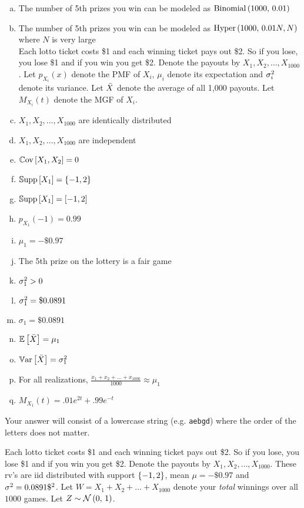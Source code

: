 \documentclass[12pt,landscape]{article}
\newcommand{\instr}{\small Your answer will consist of a lowercase string (e.g. \texttt{aebgd}) where the order of the letters does not matter. \normalsize}
\begin{document}
\vspace{-0.2cm}\benum{} 
\begin{enumerate}[(a)]
\item The number of 5th prizes you win can be modeled as $\mathrm{Binomial}\left(1000,\,0.01\right)$
\item The number of 5th prizes you win can be modeled as $\mathrm{Hyper}\left(1000,\,0.01 N,N\right)$ where $N$ is very large \\

Each lotto ticket costs \$1 and each winning ticket pays out \$2. So if you lose, you lose \$1 and if you win you get \$2. Denote the payouts by $X_1, X_2, \ldots, X_{1000}$. Let $p_{X_i}(x)$ denote the PMF of $X_i$, $\mu_i$ denote its expectation and $\sigma^2_i$ denote its variance. Let $\bar{X}$ denote the average of all 1,000 payouts. Let $M_{X_i}(t)$ denote the MGF of $X_i$.

\item $X_1, X_2, \ldots, X_{1000}$ are identically distributed
\item $X_1, X_2, \ldots, X_{1000}$ are independent
\item $\mathbb{C}\text{ov}\left[X_1, X_2\right] = 0$
\item $\mathbb{S}\text{upp}\left[X_1\right] = \left\{-1, 2\right\}$ 
\item $\mathbb{S}\text{upp}\left[X_1\right] = \left[-1, 2\right]$ 
\item $p_{X_1}(-1) = 0.99$ 
\item $\mu_1 = -\$0.97$
\item The 5th prize on the lottery is a fair game
\item $\sigma^2_1 > 0$
\item $\sigma^2_1 = \$0.0891$
\item $\sigma_1 = \$0.0891$
\item $\mathbb{E}\left[\bar{X}\right] = \mu_1$
\item $\mathbb{V}\text{ar}\left[\bar{X}\right] = \sigma^2_1$
\item For all realizations, $\displaystyle\frac{x_1 + x_2 + \ldots + x_{1000}}{1000} \approx \mu_1$
\item $M_{X_1}(t) = .01e^{2t} + .99e^{-t}$
\end{enumerate}
\eenum\instr\pagebreak



\problem{}  Each lotto ticket costs \$1 and each winning ticket pays out \$2. So if you lose, you lose \$1 and if you win you get \$2. Denote the payouts by $X_1, X_2, \ldots, X_{1000}$. These rv's are iid distributed with support $\left\{-1, 2\right\}$, mean $\mu = -\$0.97$ and $\sigma^2 = 0.0891\$^2$. Let $W = X_1 + X_2 + \ldots + X_{1000}$ denote your \emph{total} winnings over all $1000$ games. Let $Z \sim \mathcal{N}\left(0,\,1\right)$.
\end{document}
